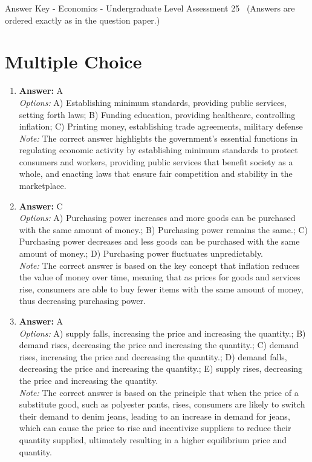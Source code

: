 \documentclass[12pt]{article}
\begin{document}
\begin{center}
Answer Key - Economics - Undergraduate Level Assessment 25 \
\small (Answers are ordered exactly as in the question paper.)
\end{center}

\section*{Multiple Choice}
\begin{enumerate}[label=\arabic*.]
\item \textbf{Answer:} A
\\ \textit{Options:} A) Establishing minimum standards, providing public services, setting forth laws; B) Funding education, providing healthcare, controlling inflation; C) Printing money, establishing trade agreements, military defense
\\ \textit{Note:} The correct answer highlights the government's essential functions in regulating economic activity by establishing minimum standards to protect consumers and workers, providing public services that benefit society as a whole, and enacting laws that ensure fair competition and stability in the marketplace.
\item \textbf{Answer:} C
\\ \textit{Options:} A) Purchasing power increases and more goods can be purchased with the same amount of money.; B) Purchasing power remains the same.; C) Purchasing power decreases and less goods can be purchased with the same amount of money.; D) Purchasing power fluctuates unpredictably.
\\ \textit{Note:} The correct answer is based on the key concept that inflation reduces the value of money over time, meaning that as prices for goods and services rise, consumers are able to buy fewer items with the same amount of money, thus decreasing purchasing power.
\item \textbf{Answer:} A
\\ \textit{Options:} A) supply falls, increasing the price and increasing the quantity.; B) demand rises, decreasing the price and increasing the quantity.; C) demand rises, increasing the price and decreasing the quantity.; D) demand falls, decreasing the price and increasing the quantity.; E) supply rises, decreasing the price and increasing the quantity.
\\ \textit{Note:} The correct answer is based on the principle that when the price of a substitute good, such as polyester pants, rises, consumers are likely to switch their demand to denim jeans, leading to an increase in demand for jeans, which can cause the price to rise and incentivize suppliers to reduce their quantity supplied, ultimately resulting in a higher equilibrium price and quantity.

\end{enumerate}
\end{document}
